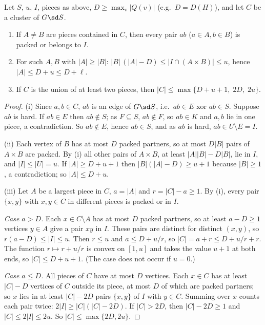 \begin{lemma}\label{lem:SM}
Let $S$, $u$, $I$, pieces as above, $D\ge\max_v|Q(v)|$ (e.g.\ $D=D(H)$), and let $C$ be a cluster of $G\sd S$.
\begin{enumerate}
\item[(i)] If $A\ne B$ are pieces contained in $C$, then every pair $ab$ ($a\in A,b\in B$) is packed or belongs to $I$.
\item[(ii)] For such $A,B$ with $|A|\ge|B|$: $|B|\,(|A|-D)\le|I\cap(A\times B)|\le u$, hence $|A|\le D+u\le D+\ell$.
\item[(iii)] If $C$ is the union of at least two pieces, then $|C|\le\max\{D+u+1,\;2D,\;2u\}$.
\end{enumerate}
\end{lemma}
\begin{proof}
(i) Since $a,b\in C$, $ab$ is an edge of $G\sd S$, i.e.\ $ab\in E$ xor $ab\in S$. Suppose $ab$ is hard. If $ab\in E$ then $ab\notin S$; as $F\subseteq S$, $ab\notin F$, so $ab\in K$ and $a,b$ lie in one piece, a contradiction. So $ab\notin E$, hence $ab\in S$, and as $ab$ is hard, $ab\in U\setminus E=I$.

(ii) Each vertex of $B$ has at most $D$ packed partners, so at most $D|B|$ pairs of $A\times B$ are packed. By (i) all other pairs of $A\times B$, at least $|A||B|-D|B|$, lie in $I$, and $|I|\le|U|=u$. If $|A|\ge D+u+1$ then $|B|(|A|-D)\ge u+1$ because $|B|\ge1$, a contradiction; so $|A|\le D+u$.

(iii) Let $A$ be a largest piece in $C$, $a=|A|$ and $r=|C|-a\ge1$. By (i), every pair $\{x,y\}$ with $x,y\in C$ in different pieces is packed or in $I$.

\emph{Case $a>D$.} Each $x\in C\setminus A$ has at most $D$ packed partners, so at least $a-D\ge1$ vertices $y\in A$ give a pair $xy$ in $I$. These pairs are distinct for distinct $(x,y)$, so $r(a-D)\le|I|\le u$. Then $r\le u$ and $a\le D+u/r$, so $|C|=a+r\le D+u/r+r$. The function $r\mapsto r+u/r$ is convex on $[1,u]$ and takes the value $u+1$ at both ends, so $|C|\le D+u+1$. (The case does not occur if $u=0$.)

\emph{Case $a\le D$.} All pieces of $C$ have at most $D$ vertices. Each $x\in C$ has at least $|C|-D$ vertices of $C$ outside its piece, at most $D$ of which are packed partners; so $x$ lies in at least $|C|-2D$ pairs $\{x,y\}$ of $I$ with $y\in C$. Summing over $x$ counts each pair twice: $2|I|\ge|C|(|C|-2D)$. If $|C|>2D$, then $|C|-2D\ge1$ and $|C|\le2|I|\le2u$. So $|C|\le\max\{2D,2u\}$.
\end{proof}
